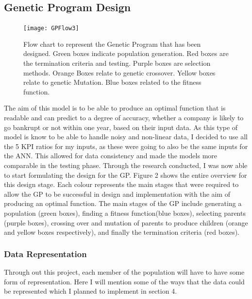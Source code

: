 \documentclass[11pt]{article}
\begin{document}
\subsection{Genetic Program Design}
\begin{figure}[h]
\centering
\texttt{[image: GPFlow3]}
\caption{Flow chart to represent the Genetic Program that has been designed. Green boxes indicate population generation. Red boxes are the termination criteria and testing. Purple boxes are selection methods. Orange Boxes relate to genetic crossover. Yellow boxes relate to genetic Mutation. Blue boxes related to the fitness function. } 
\end{figure}
The aim of this model is to be able to produce an optimal function that is readable and can predict to a degree of accuracy, whether a company is likely to go bankrupt or not within one year, based on their input data. As this type of model is know to be able to handle noisy and non-linear data, I decided to use all the 5 KPI ratios for my inputs, as these were going to also be the same inputs for the ANN. This allowed for data consistency and made the models more comparable in the testing phase. Through the research conducted, I was now able to start formulating the design for the GP.  Figure 2 shows the entire overview for this design stage. Each colour represents the main stages that were required to allow the GP to be successful in design and implementation with the aim of producing an optimal function.  The main stages of the GP include generating a population (green boxes), finding a fitness function(blue boxes), selecting parents (purple boxes), crossing over and mutation of parents to produce children (orange and yellow boxes respectively), and finally the termination criteria (red boxes). 
\subsubsection{Data Representation}
Through out this project, each member of the population will have to have some form of representation. Here I will mention some of the ways that the data could be represented which I planned to implement in section 4. 
\end{document}
